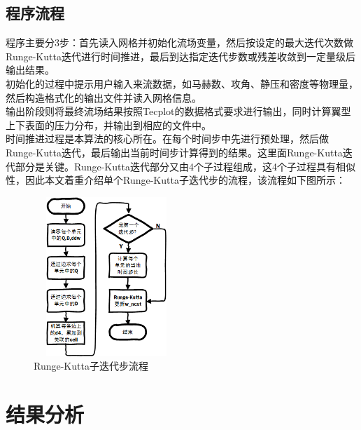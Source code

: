 \documentclass[UTF8]{ctexart}
\begin{document}
\subsection{程序流程}
程序主要分3步：首先读入网格并初始化流场变量，然后按设定的最大迭代次数做Runge-Kutta迭代进行时间推进，最后到达指定迭代步数或残差收敛到一定量级后输出结果。\\
\indent 初始化的过程中提示用户输入来流数据，如马赫数、攻角、静压和密度等物理量，然后构造格式化的输出文件并读入网格信息。\\
\indent 输出阶段则将最终流场结果按照Tecplot的数据格式要求进行输出，同时计算翼型上下表面的压力分布，并输出到相应的文件中。\\
\indent 时间推进过程是本算法的核心所在。在每个时间步中先进行预处理，然后做Runge-Kutta迭代，最后输出当前时间步计算得到的结果。这里面Runge-Kutta迭代部分是关键。Runge-Kutta迭代部分又由4个子过程组成，这4个子过程具有相似性，因此本文着重介绍单个Runge-Kutta子迭代步的流程，该流程如下图所示：
\begin{figure}[htbp]\centering
\includegraphics[width=5.5cm,height=6cm]{../data/runge_kutta_sub.png}
\caption{Runge-Kutta子迭代步流程}
\end{figure}

\section{结果分析}
\end{document}

